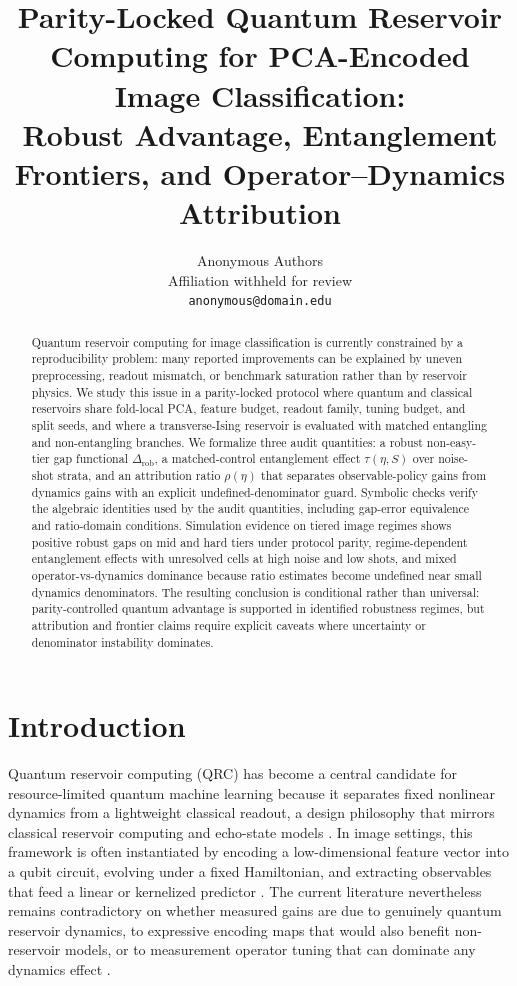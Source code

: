 \documentclass{article} %
\title{Parity-Locked Quantum Reservoir Computing for PCA-Encoded Image Classification:\\
Robust Advantage, Entanglement Frontiers, and Operator--Dynamics Attribution}
\author{Anonymous Authors \\
Affiliation withheld for review \\
\texttt{anonymous@domain.edu}}
\begin{document}
\maketitle

\begin{abstract}
Quantum reservoir computing for image classification is currently constrained by a reproducibility problem: many reported improvements can be explained by uneven preprocessing, readout mismatch, or benchmark saturation rather than by reservoir physics. We study this issue in a parity-locked protocol where quantum and classical reservoirs share fold-local PCA, feature budget, readout family, tuning budget, and split seeds, and where a transverse-Ising reservoir is evaluated with matched entangling and non-entangling branches. We formalize three audit quantities: a robust non-easy-tier gap functional $\Delta_{\mathrm{rob}}$, a matched-control entanglement effect $\tau(\eta,S)$ over noise-shot strata, and an attribution ratio $\rho(\eta)$ that separates observable-policy gains from dynamics gains with an explicit undefined-denominator guard. Symbolic checks verify the algebraic identities used by the audit quantities, including gap-error equivalence and ratio-domain conditions. Simulation evidence on tiered image regimes shows positive robust gaps on mid and hard tiers under protocol parity, regime-dependent entanglement effects with unresolved cells at high noise and low shots, and mixed operator-vs-dynamics dominance because ratio estimates become undefined near small dynamics denominators. The resulting conclusion is conditional rather than universal: parity-controlled quantum advantage is supported in identified robustness regimes, but attribution and frontier claims require explicit caveats where uncertainty or denominator instability dominates.
\end{abstract}

\section{Introduction}
\label{sec:intro}
Quantum reservoir computing (QRC) has become a central candidate for resource-limited quantum machine learning because it separates fixed nonlinear dynamics from a lightweight classical readout, a design philosophy that mirrors classical reservoir computing and echo-state models \citep{url_echo_state_2001,doi_10_1162_089976602760407955,arxiv_2102_11831}. In image settings, this framework is often instantiated by encoding a low-dimensional feature vector into a qubit circuit, evolving under a fixed Hamiltonian, and extracting observables that feed a linear or kernelized predictor \citep{arxiv_2409_00998,arxiv_2602_14677,arxiv_2602_18377}. The current literature nevertheless remains contradictory on whether measured gains are due to genuinely quantum reservoir dynamics, to expressive encoding maps that would also benefit non-reservoir models, or to measurement operator tuning that can dominate any dynamics effect \citep{arxiv_2101_11020,arxiv_2008_08605,arxiv_2503_17939,arxiv_2503_22380,arxiv_2602_17440}.
\end{document}
